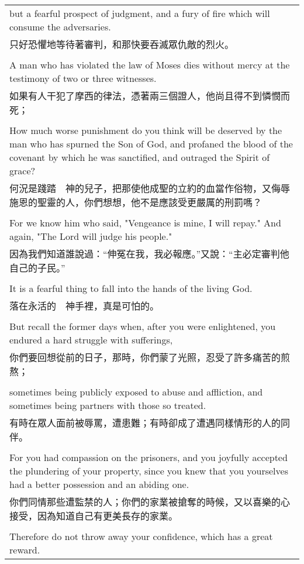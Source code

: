 \begin{tabularx}{\textwidth}{p{}}
but a fearful prospect of judgment, and a fury of fire which will consume the adversaries. \\
只好恐懼地等待著審判，和那快要吞滅眾仇敵的烈火。 \\ \\
A man who has violated the law of Moses dies without mercy at the testimony of two or three witnesses. \\
如果有人干犯了摩西的律法，憑著兩三個證人，他尚且得不到憐憫而死； \\ \\
How much worse punishment do you think will be deserved by the man who has spurned the Son of God, and profaned the blood of the covenant by which he was sanctified, and outraged the Spirit of grace? \\
何況是踐踏　神的兒子，把那使他成聖的立約的血當作俗物，又侮辱施恩的聖靈的人，你們想想，他不是應該受更嚴厲的刑罰嗎？ \\ \\
For we know him who said, "Vengeance is mine, I will repay." And again, "The Lord will judge his people." \\
因為我們知道誰說過：“伸冤在我，我必報應。”又說：“主必定審判他自己的子民。” \\ \\
It is a fearful thing to fall into the hands of the living God. \\
落在永活的　神手裡，真是可怕的。 \\ \\
But recall the former days when, after you were enlightened, you endured a hard struggle with sufferings, \\
你們要回想從前的日子，那時，你們蒙了光照，忍受了許多痛苦的煎熬； \\ \\
sometimes being publicly exposed to abuse and affliction, and sometimes being partners with those so treated. \\
有時在眾人面前被辱罵，遭患難；有時卻成了遭遇同樣情形的人的同伴。 \\ \\
For you had compassion on the prisoners, and you joyfully accepted the plundering of your property, since you knew that you yourselves had a better possession and an abiding one. \\
你們同情那些遭監禁的人；你們的家業被搶奪的時候，又以喜樂的心接受，因為知道自己有更美長存的家業。 \\ \\
Therefore do not throw away your confidence, which has a great reward. \\

\end{tabularx}
